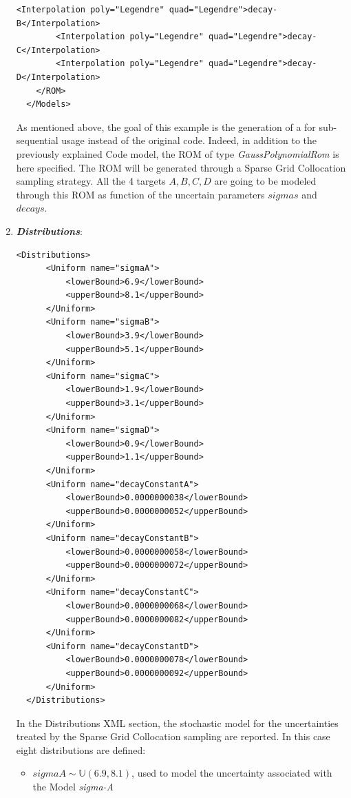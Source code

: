 \begin{enumerate}
\begin{lstlisting}[style=XML,morekeywords={arg,extension,pauseAtEnd,overwrite}]
        <Interpolation poly="Legendre" quad="Legendre">decay-B</Interpolation>
        <Interpolation poly="Legendre" quad="Legendre">decay-C</Interpolation>
        <Interpolation poly="Legendre" quad="Legendre">decay-D</Interpolation>
    </ROM>
  </Models>
\end{lstlisting}
 As mentioned above, the goal of this example is the generation of a  
 for sub-sequential usage instead of the original code. Indeed, in addition to the previously explained Code model,
 the ROM of type \textit{GaussPolynomialRom} is here specified. The ROM will be generated through a Sparse Grid
 Collocation sampling strategy. All the 4 targets $A,B,C,D$ are going to be modeled through this ROM as function
 of the uncertain parameters $sigmas$ and $decays$.
   \item \textbf{\textit{Distributions}}:
\begin{lstlisting}[style=XML,morekeywords={arg,extension,pauseAtEnd,overwrite}]
  <Distributions>
      <Uniform name="sigmaA">
          <lowerBound>6.9</lowerBound>
          <upperBound>8.1</upperBound>
      </Uniform>
      <Uniform name="sigmaB">
          <lowerBound>3.9</lowerBound>
          <upperBound>5.1</upperBound>
      </Uniform>
      <Uniform name="sigmaC">
          <lowerBound>1.9</lowerBound>
          <upperBound>3.1</upperBound>
      </Uniform>
      <Uniform name="sigmaD">
          <lowerBound>0.9</lowerBound>
          <upperBound>1.1</upperBound>
      </Uniform>
      <Uniform name="decayConstantA">
          <lowerBound>0.0000000038</lowerBound>
          <upperBound>0.0000000052</upperBound>
      </Uniform>
      <Uniform name="decayConstantB">
          <lowerBound>0.0000000058</lowerBound>
          <upperBound>0.0000000072</upperBound>
      </Uniform>
      <Uniform name="decayConstantC">
          <lowerBound>0.0000000068</lowerBound>
          <upperBound>0.0000000082</upperBound>
      </Uniform>
      <Uniform name="decayConstantD">
          <lowerBound>0.0000000078</lowerBound>
          <upperBound>0.0000000092</upperBound>
      </Uniform>
  </Distributions>
\end{lstlisting}
  In the Distributions XML section, the stochastic model for the 
  uncertainties  treated by the Sparse Grid Collocation sampling are reported. In 
  this case eight distributions are defined: 
  \begin{itemize}
    \item $sigmaA \sim \mathbb{U}(6.9,8.1)$, used to model the uncertainty 
    associated with  the Model \textit{sigma-A}

\end{itemize}
\end{enumerate}
